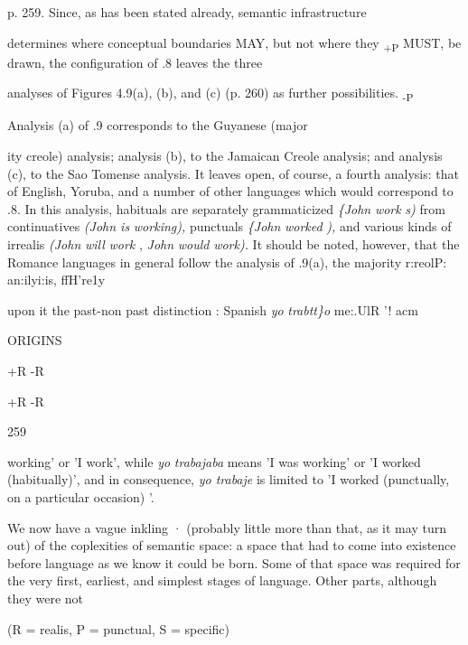 p. 259. Since, as has been stated already, semantic infrastructure

determines where conceptual boundaries MAY, but not where they \textsubscript{+P }MUST, be drawn, the configuration of .8 leaves the three

analyses of Figures 4.9(a), (b), and (c) (p. 260) as further possibilities. \textsubscript{{}-}\textsubscript{P}

Analysis (a) of .9 corresponds to the Guyanese (major\-

ity creole) analysis; analysis (b), to the Jamaican Creole analysis; and analysis (c), to the Sao Tomense analysis. It leaves open, of course, a fourth analysis: that of English, Yoruba, and a number of other languages which would correspond to .8. In this analysis, habituals are separately grammaticized \textit{\{John} \textit{work} \textit{s)} from continua\-tives \textit{(John is} \textit{workin}\textit{g}\textit{), }punctuals \textit{\{John} \textit{worked} \textit{), }and various kinds of irrealis \textit{(John} \textit{will} \textit{work} , \textit{John} \textit{would} \textit{wor}\textit{k}\textit{).} It should be noted, however, that the Romance languages in general follow the analysis of .9(a), the majority r:reolP: an:ilyi:is, ffH're1y   


 \textsubscript{ }upon it the past-non past distinction : Spanish \textit{yo }\textit{trabtt\}o }me:.UlR '! acm

ORIGINS

+R -R 

+R -R

259

working' or 'I work', while \textit{yo} \textit{trabajaba} means 'I was working' or 'I worked (habitually)', and in consequence, \textit{yo trabaje} is limited to 'I worked (punctually, on a particular occasion) '.

We now have a vague inkling · (probably little more than that, as it may turn out) of the coplexities of semantic space: a space that had to come into existence before language as we know it could be born. Some of that space was required for the very first, earliest, and simplest stages of language. Other parts, although they were not

(R = realis, P = punctual, S = specific)

